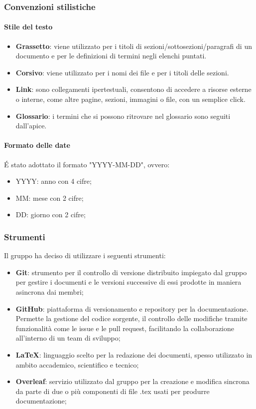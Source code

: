 \subsubsection{Convenzioni stilistiche}
    \paragraph{Stile del testo}
    \begin{itemize}
        \item \textbf{Grassetto}: viene utilizzato per i titoli di sezioni/sottosezioni/paragrafi di un documento e per le definizioni di termini negli elenchi puntati.
        \item \textbf{Corsivo}: viene utilizzato per i nomi dei file e per i titoli delle sezioni.
        \item \textbf{Link}: sono collegamenti ipertestuali, consentono di accedere a risorse esterne o interne, come altre pagine, sezioni, immagini o file, con un semplice click.
        \item \textbf{Glossario}: i termini che si possono ritrovare nel glossario sono seguiti dall'apice.
    \end{itemize}

    \paragraph{Formato delle date}
    \'E stato adottato il formato "YYYY-MM-DD", ovvero:
    \begin{itemize}
        \item YYYY: anno con 4 cifre;
        \item MM: mese con 2 cifre;
        \item DD: giorno con 2 cifre;
    \end{itemize}

\subsubsection{Strumenti}
Il gruppo ha deciso di utilizzare i seguenti strumenti:
\begin{itemize}
    \item \textbf{Git}: strumento per il controllo di versione distribuito impiegato dal gruppo per gestire i documenti e le versioni successive di essi prodotte in maniera asincrona dai membri;
    \item \textbf{GitHub}: piattaforma di versionamento e repository per la documentazione. Permette la gestione del codice sorgente, il controllo delle modifiche tramite funzionalità come le issue e le pull request, facilitando la collaborazione all’interno di un team di sviluppo;
    \item \textbf{\LaTeX}: linguaggio scelto per la redazione dei documenti, spesso utilizzato in ambito accademico, scientifico e tecnico;
    \item \textbf{Overleaf}: servizio utilizzato dal gruppo per la creazione e modifica sincrona da parte di due o più componenti di file .tex usati per produrre documentazione;
\end{itemize}